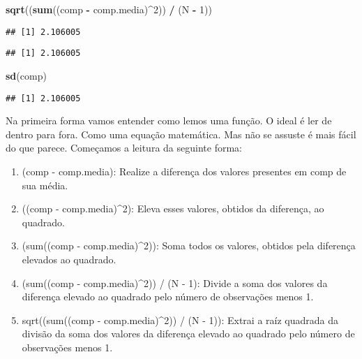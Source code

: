 \documentclass[titlepage, oneside, openany, a4paper]{book}
\newenvironment{Shaded}{\begin{snugshade}}{\end{snugshade}}
\newcommand{\DecValTok}[1]{\textcolor[rgb]{0.00,0.00,0.81}{#1}}
\newcommand{\KeywordTok}[1]{\textcolor[rgb]{0.13,0.29,0.53}{\textbf{#1}}}
\newcommand{\NormalTok}[1]{#1}
\newcommand{\OperatorTok}[1]{\textcolor[rgb]{0.81,0.36,0.00}{\textbf{#1}}}
\newcommand{\StringTok}[1]{\textcolor[rgb]{0.31,0.60,0.02}{#1}}
\providecommand{\tightlist}{%
  \setlength{\itemsep}{0pt}\setlength{\parskip}{0pt}}
\begin{document}
\begin{Shaded}
\begin{Highlighting}[]
\KeywordTok{sqrt}\NormalTok{((}\KeywordTok{sum}\NormalTok{((comp }\OperatorTok{-}\StringTok{ }\NormalTok{comp.media)}\OperatorTok{^}\DecValTok{2}\NormalTok{)) }\OperatorTok{/}\StringTok{ }\NormalTok{(N }\OperatorTok{-}\StringTok{ }\DecValTok{1}\NormalTok{))}
\end{Highlighting}
\end{Shaded}

\begin{verbatim}
## [1] 2.106005
\end{verbatim}

\begin{Shaded}
\end{Shaded}

\begin{verbatim}
## [1] 2.106005
\end{verbatim}

\begin{Shaded}
\begin{Highlighting}[]
\KeywordTok{sd}\NormalTok{(comp)}
\end{Highlighting}
\end{Shaded}

\begin{verbatim}
## [1] 2.106005
\end{verbatim}

Na primeira forma vamos entender como lemos uma função. O ideal é ler de dentro para fora. Como uma equação matemática. Mas não se assuste é mais fácil do que parece. Começamos a leitura da seguinte forma:

\begin{enumerate}
\def\labelenumi{\arabic{enumi}.}
\tightlist
\item
  (comp - comp.media): Realize a diferença dos valores presentes em comp de sua média.
\item
  ((comp - comp.media)\^{}2): Eleva esses valores, obtidos da diferença, ao quadrado.
\item
  (sum((comp - comp.media)\^{}2)): Soma todos os valores, obtidos pela diferença elevados ao quadrado.
\item
  (sum((comp - comp.media)\^{}2)) / (N - 1): Divide a soma dos valores da diferença elevado ao quadrado pelo número de observações menos 1.
\item
  sqrt((sum((comp - comp.media)\^{}2)) / (N - 1)): Extrai a raíz quadrada da divisão da soma dos valores da diferença elevado ao quadrado pelo número de observações menos 1.
\end{enumerate}
\end{document}
